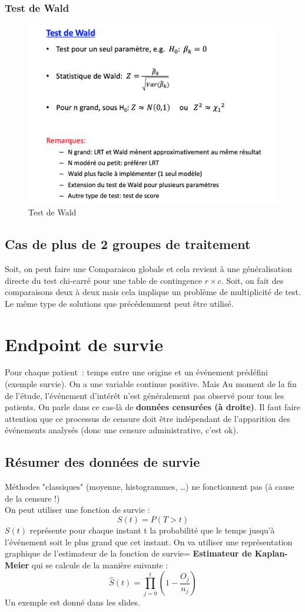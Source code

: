 \subsubsection{Test de Wald}
\begin{figure}[H]
    \centering
    \includegraphics[scale = 0.5]{images/test_wald.png}
    \caption{Test de Wald}
    \label{fig:my_label}
\end{figure}
\subsection{Cas de plus de 2 groupes de traitement}
Soit, on peut faire une Comparaison globale et cela revient à une généralisation directe du test chi-carré pour une table de contingence $r×c$. Soit, on fait des comparaisons deux à deux mais cela implique un problème de multiplicité de test. Le même type de solutions que précédemment peut être utilisé. 

\section{Endpoint de survie}
Pour chaque patient : temps entre une origine et un événement prédéfini (exemple survie). On a une variable continue positive. Mais Au moment de la fin de l'étude, l'événement d'intérêt n'est généralement pas observé pour tous les patients. On parle dans ce cas-là de \textbf{données censurées (à droite)}. Il faut faire attention que ce processus de censure doit être indépendant de l'apparition des événements analysés (donc une censure administrative, c'est ok).


\subsection{Résumer des données de survie}
Méthodes "classiques" (moyenne, histogrammes, …) ne
fonctionnent pas (à cause de la censure !)\\
On peut utiliser une fonction de survie : 
$$S(t) = P(T>t)$$
$S(t)$ représente pour chaque instant t la probabilité que le temps jusqu'à l'événement soit le plus grand que cet instant. On va utiliser une représentation graphique de l'estimateur de la fonction de survie= \textbf{Estimateur de Kaplan-Meier} qui se calcule de la manière suivante :
$$\widehat{S}(t) = \prod_{j=0}^t (1-\frac{O_{j}}{n_{j}})$$
Un exemple est donné dans les slides.

